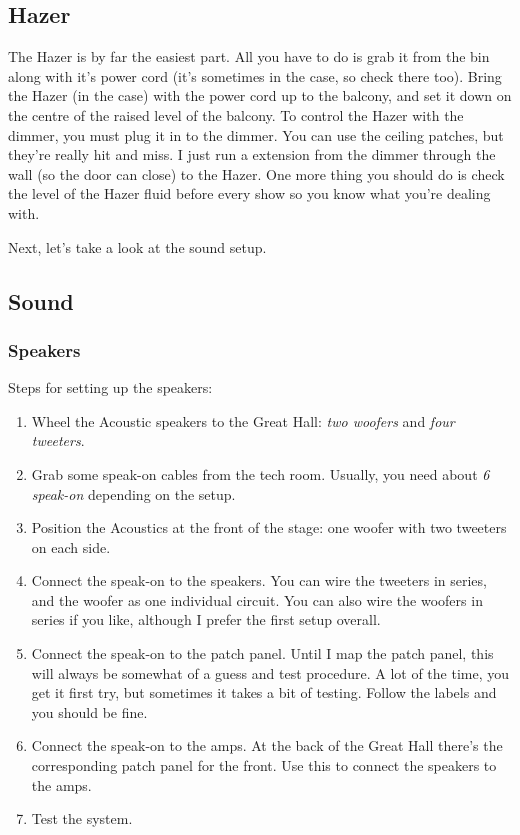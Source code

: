 \documentclass[letterpaper,10pt,oneside,headsepline]{scrreprt}
\begin{document}
\subsection{Hazer}
The Hazer is by far the easiest part. All you have to do is grab it from the bin along with it's power cord (it's sometimes in the case, so check there too). Bring the Hazer (in the case) with the power cord up to the balcony, and set it down on the centre of the raised level of the balcony. To control the Hazer with the dimmer, you must plug it in to the dimmer. You can use the ceiling patches, but they're really hit and miss. I just run a extension from the dimmer through the wall (so the door can close) to the Hazer. One more thing you should do is check the level of the Hazer fluid before every show so you know what you're dealing with.

Next, let's take a look at the sound setup.

\subsection{Sound}
\subsubsection{Speakers}

Steps for setting up the speakers:
\begin{enumerate}
\item Wheel the Acoustic speakers to the Great Hall: \textit{two woofers} and \textit{four tweeters}.
\item Grab some speak-on cables from the tech room. Usually, you need about \textit{6 speak-on} depending on the setup.
\item Position the Acoustics at the front of the stage: one woofer with two tweeters on each side.
\item Connect the speak-on to the speakers. You can wire the tweeters in series, and the woofer as one individual circuit. You can also wire the woofers in series if you like, although I prefer the first setup overall.
\item Connect the speak-on to the patch panel. Until I map the patch panel, this will always be somewhat of a guess and test procedure. A lot of the time, you get it first try, but sometimes it takes a bit of testing. Follow the labels and you should be fine.
\item Connect the speak-on to the amps. At the back of the Great Hall there's the corresponding patch panel for the front. Use this to connect the speakers to the amps.
\item Test the system.
\end{enumerate} 
\end{document}

